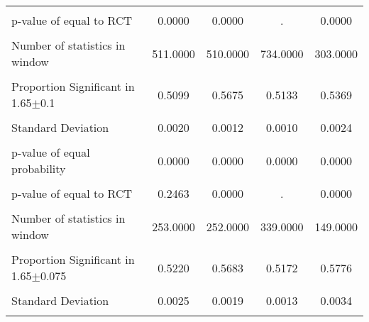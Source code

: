 {\begin{tabular}{l*{4}{c}}
                &                  &                  &                  &                  \\
p-value of equal to RCT&   0.0000         &   0.0000         &        .         &   0.0000         \\
                &                  &                  &                  &                  \\
Number of statistics in window& 511.0000         & 510.0000         & 734.0000         & 303.0000         \\
                &                  &                  &                  &                  \\
\hline Proportion Significant in 1.65$\pm$0.1&   0.5099         &   0.5675         &   0.5133         &   0.5369         \\
                &                  &                  &                  &                  \\
Standard Deviation&   0.0020         &   0.0012         &   0.0010         &   0.0024         \\
                &                  &                  &                  &                  \\
p-value of equal probability&   0.0000         &   0.0000         &   0.0000         &   0.0000         \\
                &                  &                  &                  &                  \\
p-value of equal to RCT&   0.2463         &   0.0000         &        .         &   0.0000         \\
                &                  &                  &                  &                  \\
Number of statistics in window& 253.0000         & 252.0000         & 339.0000         & 149.0000         \\
                &                  &                  &                  &                  \\
\hline Proportion Significant in 1.65$\pm$0.075&   0.5220         &   0.5683         &   0.5172         &   0.5776         \\
                &                  &                  &                  &                  \\
Standard Deviation&   0.0025         &   0.0019         &   0.0013         &   0.0034         \\
                &                  &                  &                  &                  \\

\end{tabular}}
